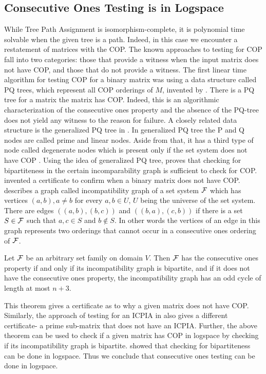 \subsection{Consecutive Ones Testing is in Logspace}
\label{sec:cotlogspace}
While Tree Path Assignment is isomorphism-complete, it is polynomial
time solvable when the given tree is a path.  Indeed, in this case we
encounter a restatement of matrices with the COP.  The known
approaches to testing for COP fall into two categories: those that
provide a witness when the input matrix does not have COP, and those
that do not provide a witness.  The first linear time algorithm for
testing COP for a binary matrix was using a data structure called PQ
trees, which represent all COP orderings of $M$, invented by
\cite{bl76}. There is a PQ tree for a matrix \iff the matrix has COP.
Indeed, this is an algorithmic characterization of the consecutive
ones property and the absence of the PQ-tree does not yield any
witness to the reason for failure.  A closely related data structure
is the generalized PQ tree in \cite{mcc04}.  In generalized PQ tree
the P and Q nodes are called prime and linear nodes. Aside from that,
it has a third type of node called degenerate nodes which is present
only if the set system does not have COP \cite{mcc04}.  Using the idea
of generalized PQ tree, \cite{mcc04} proves that checking for
bipartiteness in the certain incomparability graph is sufficient to
check for COP.  \cite{mcc04} invented a certificate to confirm when a
binary matrix does not have COP.  \cite{mcc04} describes a graph
called incompatibility graph of a set system ${\cal F}$ which has vertices
$(a,b), a \ne b$ for every $a, b \in U$, $U$ being the universe of the
set system. There are edges $((a,b),(b,c))$ and $((b,a),(c,b))$ if
there is a set $S \in {\cal F}$ such that $a, c \in S$ and $b \notin S$. In
other words the vertices of an edge in this graph represents two
orderings that cannot occur in a consecutive ones ordering of ${\cal F}$.
\begin{theorem}
  Let ${\cal F}$ be an arbitrary set family on domain $V$. Then ${\cal F}$ has
  the consecutive ones property if and only if its incompatibility
  graph is bipartite, and if it does not have the consecutive ones
  property, the incompatibility graph has an odd cycle of length at
  most $n+3$.
\end{theorem}
This theorem gives a certificate as to why a given matrix does not
have COP.  Similarly, the approach of testing for an ICPIA in
\cite{nsnrs09} also gives a different certificate- a prime sub-matrix
that does not have an ICPIA.  Further, the above theorem can be used
to check if a given matrix has COP in logspace by checking if its
incompatibility graph is bipartite. \cite{rei84} showed that checking
for bipartiteness can be done in logspace. Thus we conclude that
consecutive ones testing can be done in logspace.

